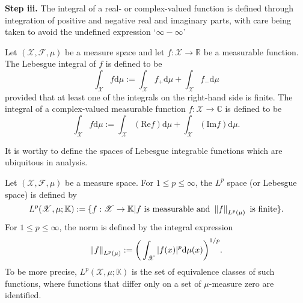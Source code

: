\textbf{Step iii.} The integral of a real- or complex-valued function is defined through integration of
positive and negative real and imaginary parts, with care being taken to avoid the undefined
expression `$\infty - \infty$'
\begin{defn}
	Let $(\mathscr{X}, \mathscr{F}, \mu)$ be a measure space and let $f : \mathscr{X} \to \mathbb{R}$ be a measurable
function. The Lebesgue integral of $f$ is defined to be
	\begin{equation*}
		\int_{\mathscr{X}}f\text{d}\mu := \int_{\mathscr{X}}f_{+}\text{d}\mu + \int_{\mathscr{X}}f_{-}\text{d}\mu
	\end{equation*}
	provided that at least one of the integrals on the right-hand side is finite. The integral of a
complex-valued measurable function $f : \mathscr{X} \to \mathbb{C}$ is defined to be
	\begin{equation*}
		\int_{\mathscr{X}}f\text{d}\mu := \int_{\mathscr{X}}(\text{Re}f)\text{d}\mu + \int_{\mathscr{X}}(\text{Im}f)\text{d}\mu.
	\end{equation*}
\end{defn}
It is worthy to define the spaces of Lebesgue integrable functions which are ubiquitous in analysis.
\begin{defn}
	Let $(\mathscr{X}, \mathscr{F}, \mu)$ be a measure space. For $1 \leq p \leq \infty$, the $L^p$ space (or
Lebesgue space) is defined by
	\begin{equation*}
		L^p(\mathscr{X}, \mu; \mathbb{K}) := \{f : \mathscr{X} \to \mathbb{K} \vert f \text{ is measurable and } \left\lVert f\right\rVert_{L^p(\mu)} \text{ is finite}\}.
	\end{equation*}
	For $1 \leq p \leq \infty$, the norm is defined by the integral expression
	\begin{equation}
		\left\lVert f\right\rVert_{L^p(\mu)} := \bigg( \int_{\mathscr{X}}\vert f(x) \vert^p\text{d}\mu(x) \bigg)^{1/p}.
	\end{equation}
	To be more precise, $	L^p(\mathscr{X}, \mu; \mathbb{K})$ is the set of equivalence classes of such functions, where
functions that differ only on a set of $\mu$-measure zero are identified.
\end{defn}
